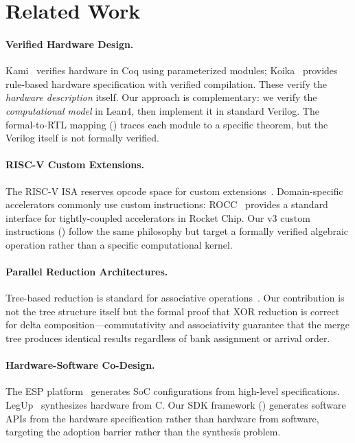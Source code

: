 \documentclass[11pt,letterpaper]{article}
\theoremstyle{plain}
\theoremstyle{definition}
\theoremstyle{remark}
\begin{document}
\section{Related Work}
\label{sec:related}

\paragraph{Verified Hardware Design.}
Kami~\cite{choi2017kami} verifies hardware in Coq using parameterized modules; Koika~\cite{bourgeat2020koika} provides rule-based hardware specification with verified compilation. These verify the \emph{hardware description} itself. Our approach is complementary: we verify the \emph{computational model} in Lean4, then implement it in standard Verilog. The formal-to-RTL mapping () traces each module to a specific theorem, but the Verilog itself is not formally verified.

\paragraph{RISC-V Custom Extensions.}
The RISC-V ISA reserves opcode space for custom extensions~\cite{waterman2019riscv}. Domain-specific accelerators commonly use custom instructions: ROCC~\cite{asanovic2016rocket} provides a standard interface for tightly-coupled accelerators in Rocket Chip. Our v3 custom instructions () follow the same philosophy but target a formally verified algebraic operation rather than a specific computational kernel.

\paragraph{Parallel Reduction Architectures.}
Tree-based reduction is standard for associative operations~\cite{blelloch1990prefix}. Our contribution is not the tree structure itself but the formal proof that XOR reduction is correct for delta composition---commutativity and associativity guarantee that the merge tree produces identical results regardless of bank assignment or arrival order.

\paragraph{Hardware-Software Co-Design.}
The ESP platform~\cite{mantovani2020esp} generates SoC configurations from high-level specifications. LegUp~\cite{canis2011legup} synthesizes hardware from C. Our SDK framework () generates software APIs from the hardware specification rather than hardware from software, targeting the adoption barrier rather than the synthesis problem.
\end{document}
